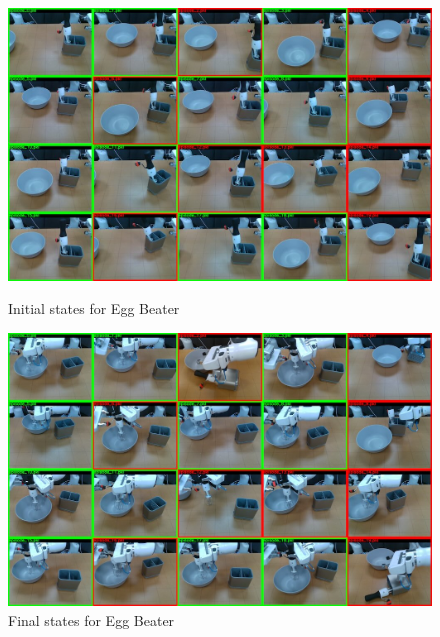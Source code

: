 \documentclass[Afour,sageh,times]{sagej}
\begin{document}
\begin{figure}
    \centering
    \includegraphics[width=\linewidth]{figure/ijrr24_egg_beater_ini.jpg}
    \caption{Initial states for Egg Beater}
    \label{fig:egg_beater_ini}
    \centering
    \includegraphics[width=\linewidth]{figure/ijrr24_egg_beater_last.jpg}
    \caption{Final states for Egg Beater}
    \label{fig:egg_beater_last}
\end{figure}
\end{document}
